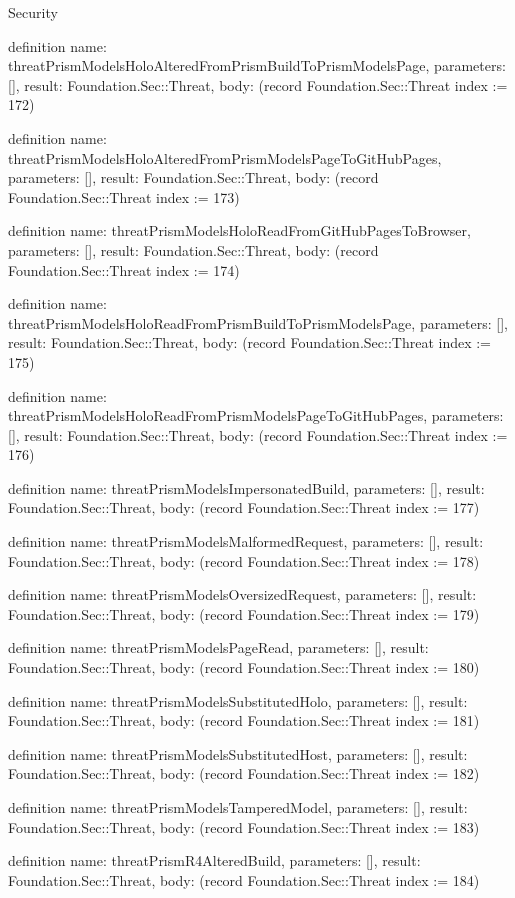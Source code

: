 \begin{lexlean}{Security}
\begin{semanticmodule}
definition{
  name: threatPrismModelsHoloAlteredFromPrismBuildToPrismModelsPage,
  parameters: [],
  result: Foundation.Sec::Threat,
  body: (record Foundation.Sec::Threat {index := 172})
}

definition{
  name: threatPrismModelsHoloAlteredFromPrismModelsPageToGitHubPages,
  parameters: [],
  result: Foundation.Sec::Threat,
  body: (record Foundation.Sec::Threat {index := 173})
}

definition{
  name: threatPrismModelsHoloReadFromGitHubPagesToBrowser,
  parameters: [],
  result: Foundation.Sec::Threat,
  body: (record Foundation.Sec::Threat {index := 174})
}

definition{
  name: threatPrismModelsHoloReadFromPrismBuildToPrismModelsPage,
  parameters: [],
  result: Foundation.Sec::Threat,
  body: (record Foundation.Sec::Threat {index := 175})
}

definition{
  name: threatPrismModelsHoloReadFromPrismModelsPageToGitHubPages,
  parameters: [],
  result: Foundation.Sec::Threat,
  body: (record Foundation.Sec::Threat {index := 176})
}

definition{
  name: threatPrismModelsImpersonatedBuild,
  parameters: [],
  result: Foundation.Sec::Threat,
  body: (record Foundation.Sec::Threat {index := 177})
}

definition{
  name: threatPrismModelsMalformedRequest,
  parameters: [],
  result: Foundation.Sec::Threat,
  body: (record Foundation.Sec::Threat {index := 178})
}

definition{
  name: threatPrismModelsOversizedRequest,
  parameters: [],
  result: Foundation.Sec::Threat,
  body: (record Foundation.Sec::Threat {index := 179})
}

definition{
  name: threatPrismModelsPageRead,
  parameters: [],
  result: Foundation.Sec::Threat,
  body: (record Foundation.Sec::Threat {index := 180})
}

definition{
  name: threatPrismModelsSubstitutedHolo,
  parameters: [],
  result: Foundation.Sec::Threat,
  body: (record Foundation.Sec::Threat {index := 181})
}

definition{
  name: threatPrismModelsSubstitutedHost,
  parameters: [],
  result: Foundation.Sec::Threat,
  body: (record Foundation.Sec::Threat {index := 182})
}

definition{
  name: threatPrismModelsTamperedModel,
  parameters: [],
  result: Foundation.Sec::Threat,
  body: (record Foundation.Sec::Threat {index := 183})
}

definition{
  name: threatPrismR4AlteredBuild,
  parameters: [],
  result: Foundation.Sec::Threat,
  body: (record Foundation.Sec::Threat {index := 184})
}


\end{semanticmodule}
\end{lexlean}
